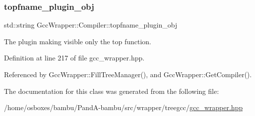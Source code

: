 \subsubsection{\texorpdfstring{topfname\+\_\+plugin\+\_\+obj}{topfname\_plugin\_obj}}
{\footnotesize\ttfamily std\+::string Gcc\+Wrapper\+::\+Compiler\+::topfname\+\_\+plugin\+\_\+obj}



The plugin making visible only the top function. 



Definition at line 217 of file gcc\+\_\+wrapper.\+hpp.



Referenced by Gcc\+Wrapper\+::\+Fill\+Tree\+Manager(), and Gcc\+Wrapper\+::\+Get\+Compiler().



The documentation for this class was generated from the following file\+:\begin{DoxyCompactItemize}
\item 
/home/osboxes/bambu/\+Pand\+A-\/bambu/src/wrapper/treegcc/\hyperlink{gcc__wrapper_8hpp}{gcc\+\_\+wrapper.\+hpp}\end{DoxyCompactItemize}
